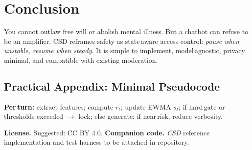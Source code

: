\documentclass[11pt]{article}
\begin{document}
\section{Conclusion}
You cannot outlaw free will or abolish mental illness. But a chatbot can refuse to be an amplifier. CSD reframes safety as state\,aware access control: \emph{pause when unstable, resume when steady}. It is simple to implement, model\,agnostic, privacy\,minimal, and compatible with existing moderation.

\subsection*{Practical Appendix: Minimal Pseudocode}
\begin{tcolorbox}[colback=gray!4]
\textbf{Per\,turn:} extract features; compute \(r_t\); update EWMA \(s_t\); if hard\,gate or thresholds exceeded $\to$ lock; else generate; if near\,risk, reduce verbosity.
\end{tcolorbox}

\printbibliography

\vspace{1em}
\noindent\footnotesize\textbf{License.} Suggested: CC BY 4.0. \hfill \textbf{Companion code.} \emph{CSD} reference implementation and test harness to be attached in repository.
\end{document}

